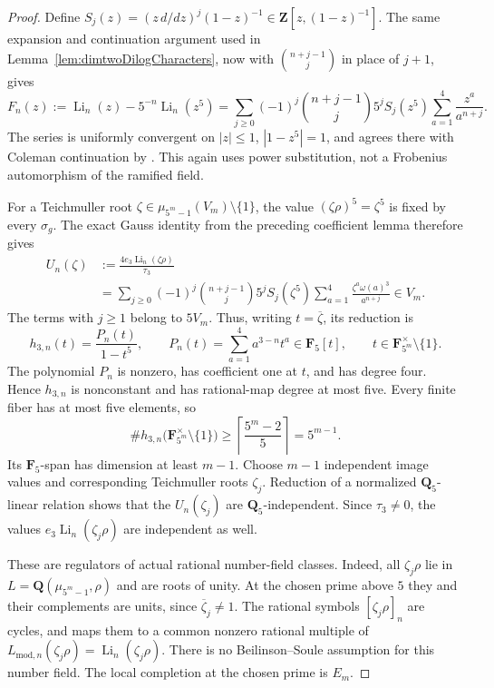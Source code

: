 \documentclass[11pt,a4paper]{article}
\theoremstyle{remark}
\begin{document}
\begin{proof}
Define
$S_j(z)=(z\,d/dz)^j(1-z)^{-1}\in\mathbf Z[z,(1-z)^{-1}]$.
The same expansion and continuation argument used in
Lemma~\ref{lem:dimtwoDilogCharacters}, now with
$\binom{n+j-1}{j}$ in place of $j+1$, gives
\[
 F_n(z):=\operatorname{Li}_n(z)-5^{-n}\operatorname{Li}_n(z^5)
 =\sum_{j\geq0}(-1)^j\binom{n+j-1}{j}5^j S_j(z^5)
             \sum_{a=1}^4\frac{z^a}{a^{n+j}}.
\]
The series is uniformly convergent on $|z|\leq1$,
$|1-z^5|=1$, and agrees there with Coleman continuation by
\cite[Theorem~2.7(3)]{BesserDeJeuAlgorithm}.
This again uses power substitution, not a Frobenius automorphism
of the ramified field.

For a Teichmuller root
$\zeta\in\mu_{5^m-1}(V_m)\setminus\{1\}$, the value
$(\zeta\rho)^5=\zeta^5$ is fixed by every $\sigma_g$.
The exact Gauss identity from the preceding coefficient lemma
therefore gives
\begin{equation}
\label{eq:dimtwoVisibleHigherDepletion}
\begin{split}
 U_n(\zeta)
 &:=\frac{4e_3\operatorname{Li}_n(\zeta\rho)}{\tau_3}\\
 &=\sum_{j\geq0}(-1)^j\binom{n+j-1}{j}5^j S_j(\zeta^5)
        \sum_{a=1}^4\frac{\zeta^a\omega(a)^3}{a^{n+j}}
       \in V_m.
\end{split}
\end{equation}
The terms with $j\geq1$ belong to $5V_m$.  Thus, writing
$t=\overline\zeta$, its reduction is
\[
 h_{3,n}(t)
   =\frac{P_n(t)}{1-t^5},\qquad
 P_n(t)=\sum_{a=1}^4a^{3-n}t^a\in\mathbf F_5[t],
 \qquad t\in\mathbf F_{5^m}^{\times}\setminus\{1\}.
\]
The polynomial $P_n$ is nonzero, has coefficient one at $t$,
and has degree four.  Hence $h_{3,n}$ is nonconstant and has
rational-map degree at most five.  Every finite fiber has at most
five elements, so
\[
 \#h_{3,n}\bigl(\mathbf F_{5^m}^{\times}\setminus\{1\}\bigr)
 \geq\left\lceil\frac{5^m-2}{5}\right\rceil=5^{m-1}.
\]
Its $\mathbf F_5$-span has dimension at least $m-1$.
Choose $m-1$ independent image values and corresponding
Teichmuller roots $\zeta_j$.  Reduction of a normalized
$\mathbf Q_5$-linear relation shows that the $U_n(\zeta_j)$
are $\mathbf Q_5$-independent.  Since $\tau_3\ne0$, the values
$e_3\operatorname{Li}_n(\zeta_j\rho)$ are independent as well.

These are regulators of actual rational number-field classes.
Indeed, all $\zeta_j\rho$ lie in
$L=\mathbf Q(\mu_{5^m-1},\rho)$ and are roots of unity.
At the chosen prime above $5$ they and their complements are
units, since $\overline\zeta_j\ne1$.  The rational symbols
$[\zeta_j\rho]_n$ are cycles, and
\cite[Theorem~1.10(2)]{BesserDeJeu} maps them to a common
nonzero rational multiple of
$L_{\mathrm{mod},n}(\zeta_j\rho)
 =\operatorname{Li}_n(\zeta_j\rho)$.
There is no Beilinson--Soule assumption for this number field.
The local completion at the chosen prime is $E_m$.


\end{proof}
\end{document}
